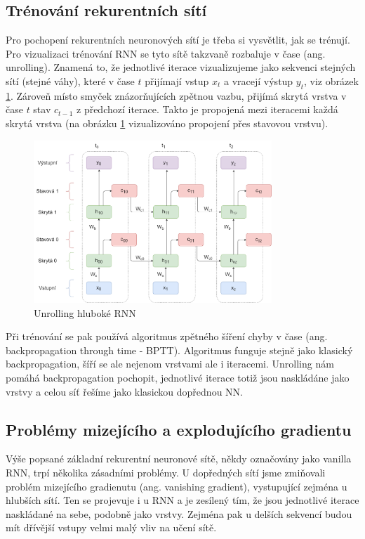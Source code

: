\subsection{Trénování rekurentních sítí}

Pro pochopení rekurentních neuronových sítí je třeba si vysvětlit, jak se
trénují. Pro vizualizaci trénování RNN se tyto sítě takzvaně rozbaluje v čase
(ang. unrolling). Znamená to, že jednotlivé iterace vizualizujeme jako sekvenci
stejných sítí (stejné váhy), které v čase $t$ přijímají vstup $x_t$ a vracejí
výstup $y_t$, viz obrázek \ref{fig:bptt}. Zároveň místo smyček znázorňujících
zpětnou vazbu, přijímá skrytá vrstva v čase $t$ stav $c_{t-1}$ z předchozí
iterace. Takto je propojená mezi iteracemi každá skrytá vrstva (na obrázku
\ref{fig:bptt} vizualizováno propojení přes stavovou vrstvu).

\begin{figure}[]
    \centering
    \includegraphics[width=0.8\textwidth]{Figures/BPTT_weight.png}
    \caption{Unrolling hluboké RNN}
    \label{fig:bptt}
\end{figure}

Při trénování se pak používá algoritmus zpětného šíření chyby v čase (ang.
backpropagation through time - BPTT). Algoritmus funguje stejně jako klasický
backpropagation, šíří se ale nejenom vrstvami ale i iteracemi. Unrolling nám
pomáhá backpropagation pochopit, jednotlivé iterace totiž jsou naskládáne jako
vrstvy a celou síť řešíme jako klasickou dopřednou NN.

\subsection{Problémy mizejícího a explodujícího gradientu}

Výše popsané základní rekurentní neuronové sítě, někdy označovány jako vanilla
RNN, trpí několika zásadními problémy. U dopředných sítí jsme zmiňovali problém
mizejícího gradienutu (ang. vanishing gradient), vystupující zejména u hlubších
sítí. Ten se projevuje i u RNN a je zesílený tím, že jsou jednotlivé iterace
naskládané na sebe, podobně jako vrstvy. Zejména pak u delších sekvencí budou
mít dřívější vstupy velmi malý vliv na učení sítě.

